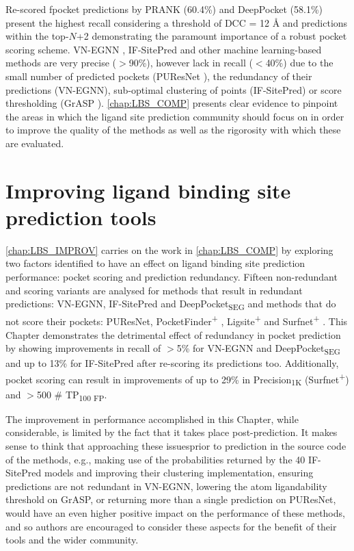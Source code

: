 Re-scored fpocket \cite{GUILLOUX_2009_FPOCKET} predictions by PRANK \cite{KRIVAK_2015_PRANK} (60.4\%) and DeepPocket \cite{AGGARWAL_2022_DEEPPOCKET} (58.1\%) present the highest recall considering a threshold of DCC = 12 \AA{} and predictions within the top-$N$+2 demonstrating the paramount importance of a robust pocket scoring scheme. VN-EGNN \cite{SESTAK_2024_VNEGNN}, IF-SitePred \cite{CARBERY_2024_IFSP} and other machine learning-based methods are very precise ($>$90\%), however lack in recall ($<$40\%) due to the small number of predicted pockets (PUResNet \cite{KANDEL_2024_PURESNET}), the redundancy of their predictions (VN-EGNN), sub-optimal clustering of points (IF-SitePred) or score thresholding (GrASP \cite{SMITH_2024_GrASP}). \autoref{chap:LBS_COMP} presents clear evidence to pinpoint the areas in which the ligand site prediction community should focus on in order to improve the quality of the methods as well as the rigorosity with which these are evaluated.

\section{Improving ligand binding site prediction tools}

\autoref{chap:LBS_IMPROV} carries on the work in \autoref{chap:LBS_COMP} by exploring two factors identified to have an effect on ligand binding site prediction performance: pocket scoring and prediction redundancy. Fifteen non-redundant and scoring variants are analysed for methods that result in redundant predictions: VN-EGNN, IF-SitePred and DeepPocket\textsubscript{SEG} and methods that do not score their pockets: PUResNet, PocketFinder\textsuperscript{+} \cite{AN_2005_POCKETFINDER}, Ligsite\textsuperscript{+} \cite{HENDLICH_1997_LIGSITE} and Surfnet\textsuperscript{+} \cite{LASKOWSKI_1995_SURFNET}. This Chapter demonstrates the detrimental effect of redundancy in pocket prediction by showing improvements in recall of $>$5\% for VN-EGNN and DeepPocket\textsubscript{SEG} and up to 13\% for IF-SitePred after re-scoring its predictions too. Additionally, pocket scoring can result in improvements of up to 29\% in Precision\textsubscript{1K} (Surfnet\textsuperscript{+}) and $>$500 \# TP\textsubscript{100 FP}.

The improvement in performance accomplished in this Chapter, while considerable, is limited by the fact that it takes place post-prediction. It makes sense to think that approaching these issuesprior to prediction in the source code of the methods, e.g., making use of the probabilities returned by the 40 IF-SitePred models and improving their clustering implementation, ensuring predictions are not redundant in VN-EGNN, lowering the atom ligandability threshold on GrASP, or returning more than a single prediction on PUResNet, would have an even higher positive impact on the performance of these methods, and so authors are encouraged to consider these aspects for the benefit of their tools and the wider community.

